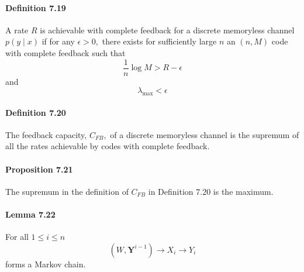 \documentclass[8pt]{article}
\begin{document}
\paragraph{Definition 7.19} A rate $R$ is achievable with complete feedback for a discrete memoryless channel $p(y \mid x)$ if for any $\epsilon>0,$ there exists for sufficiently large $n$ an $(n, M)$ code with complete feedback such that
$$
\frac{1}{n} \log M>R-\epsilon
$$
and
$$
\lambda_{\max }<\epsilon
$$
\paragraph{Definition 7.20} The feedback capacity, $C_{F B},$ of a discrete memoryless channel is the supremum of all the rates achievable by codes with complete feedback.

\paragraph{Proposition 7.21} The supremum in the definition of $C_{F B}$ in Definition 7.20 is the maximum.

\paragraph{Lemma 7.22} For all $1 \leq i \leq n$
$$
\left(W, \mathbf{Y}^{i-1}\right) \rightarrow X_{i} \rightarrow Y_{i}
$$
forms a Markov chain.
\end{document}
